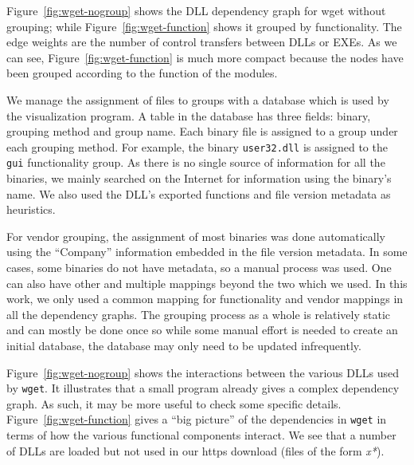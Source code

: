 Figure~\ref{fig:wget-nogroup} shows the DLL
dependency graph for wget without grouping; while
Figure~\ref{fig:wget-function} shows it grouped by functionality.
The edge weights are the number of control transfers between DLLs or EXEs.
As we can see, Figure~\ref{fig:wget-function} is much more compact
because the nodes have been grouped according to the function of the modules.

We manage the assignment of files to groups with a database which is
used by the visualization program.
A table in the database has three fields: binary,
grouping method and group name.
Each binary file is assigned to a group under each grouping method.
For example, the binary {\tt user32.dll} is assigned to the {\tt gui}
functionality group.
As there is no single source of information for all the binaries, we mainly
searched on the Internet for information using the binary's name.
We also used the DLL's exported functions and file version metadata
as heuristics.

For vendor grouping, the assignment of most binaries was done automatically
using the ``Company'' information embedded in the file version metadata.
In some cases, some binaries do not have metadata, so a manual process
was used.
One can also have other and multiple mappings beyond the two which we used.
In this work, we only used a
common mapping for functionality and vendor mappings
in all the dependency graphs.
The grouping process as a whole is relatively static and can mostly be
done once so while some manual effort is needed to create an initial
database, the database may only need to be updated infrequently.

Figure~\ref{fig:wget-nogroup} shows the interactions
between the various DLLs used by {\tt wget}.
It illustrates that a small program already
gives a complex dependency graph.
As such, it may be more useful to check some specific details.
Figure~\ref{fig:wget-function} gives
a ``big picture'' of the dependencies
in {\tt wget} in terms of how the various functional
components interact.
We see that a number of DLLs are loaded but not used in our https download
(files of the form {\it *x*}).

